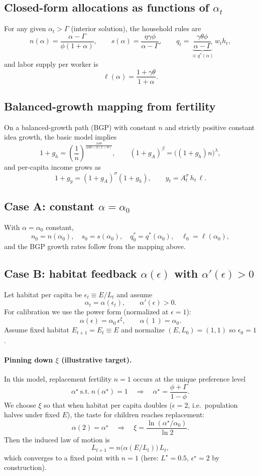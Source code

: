 \documentclass[11pt]{article}
\begin{document}
\subsection{Closed-form allocations as functions of $\alpha_t$}
For any given $\alpha_t>\Gamma$ (interior solution), the household rules are
\[
n(\alpha)=\frac{\alpha-\Gamma}{\phi(1+\alpha)},\qquad
s(\alpha)=\frac{\eta\gamma\phi}{\alpha-\Gamma},\qquad
q_t=\underbrace{\frac{\gamma\theta\phi}{\alpha-\Gamma}}_{\equiv q^{\ast}(\alpha)}\,w_t h_t,
\]
and labor supply per worker is
\[
\ell(\alpha)=\frac{1+\gamma\theta}{1+\alpha}.
\]

\subsection{Balanced-growth mapping from fertility}
On a balanced-growth path (BGP) with constant $n$ and strictly positive constant idea growth, the basic model implies
\[
1+g_h=\left(\frac{1}{n}\right)^{\frac{\lambda\sigma\theta}{\lambda\sigma\theta-\beta(1-\theta)}},\qquad
(1+g_A)^\beta=\big((1+g_h)n\big)^\lambda,
\]
and per-capita income grows as
\[
1+g_y=(1+g_A)^{\sigma}(1+g_h),
\qquad y_t=A_t^\sigma\,h_t\,\ell.
\]

\subsection{Case A: constant $\alpha=\alpha_0$}
With $\alpha=\alpha_0$ constant,
\[
n_0=n(\alpha_0),\quad s_0=s(\alpha_0),\quad q^{\ast}_0=q^{\ast}(\alpha_0),\quad \ell_0=\ell(\alpha_0),
\]
and the BGP growth rates follow from the mapping above.

\subsection{Case B: habitat feedback $\alpha(\epsilon)$ with $\alpha'(\epsilon)>0$}
Let habitat per capita be $\epsilon_t\equiv E/L_t$ and assume
\[
\alpha_t=\alpha(\epsilon_t),\qquad \alpha'(\epsilon)>0.
\]
For calibration we use the power form (normalized at $\epsilon=1$):
\[
\alpha(\epsilon)=\alpha_0\,\epsilon^{\xi},\qquad \alpha(\,1\,)=\alpha_0.
\]
Assume fixed habitat $E_{t+1}=E_t\equiv E$ and normalize $(E,L_0)=(1,1)$ so $\epsilon_0=1$.

\paragraph{Pinning down $\xi$ (illustrative target).}
In this model, replacement fertility $n=1$ occurs at the unique preference level
\[
\alpha^\star \ \text{s.t.}\ n(\alpha^\star)=1
\quad\Longrightarrow\quad
\alpha^\star=\frac{\phi+\Gamma}{1-\phi}.
\]
We choose $\xi$ so that when habitat per capita doubles ($\epsilon=2$, i.e.\ population halves under fixed $E$),
the taste for children reaches replacement:
\[
\alpha(2)=\alpha^\star
\quad\Longrightarrow\quad
\xi=\frac{\ln(\alpha^\star/\alpha_0)}{\ln 2}.
\]
Then the induced law of motion is
\[
L_{t+1}=n\!\big(\alpha(E/L_t)\big)\,L_t,
\]
which converges to a fixed point with $n=1$ (here: $L^\star=0.5$, $\epsilon^\star=2$ by construction).
\end{document}
